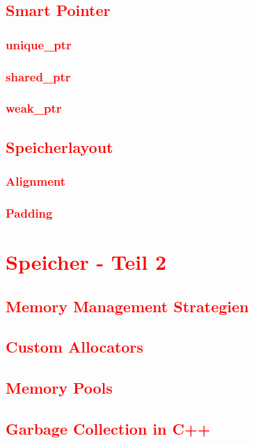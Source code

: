 \section{\textcolor{red}{Smart Pointer}}\label{sec:smart-pointers}
\subsection{\textcolor{red}{unique\_ptr}}\label{sec:unique-ptr}
\subsection{\textcolor{red}{shared\_ptr}}\label{sec:shared-ptr}
\subsection{\textcolor{red}{weak\_ptr}}\label{sec:weak-ptr}
\section{\textcolor{red}{Speicherlayout}}\label{sec:memory-layout}
\subsection{\textcolor{red}{Alignment}}\label{sec:alignment}
\subsection{\textcolor{red}{Padding}}\label{sec:padding}

\chapter{\textcolor{red}{Speicher - Teil 2}}\label{chap:memory-2}
\section{\textcolor{red}{Memory Management Strategien}}\label{sec:memory-management-strategies}
\section{\textcolor{red}{Custom Allocators}}\label{sec:custom-allocators}
\section{\textcolor{red}{Memory Pools}}\label{sec:memory-pools}
\section{\textcolor{red}{Garbage Collection in C++}}\label{sec:garbage-collection}
